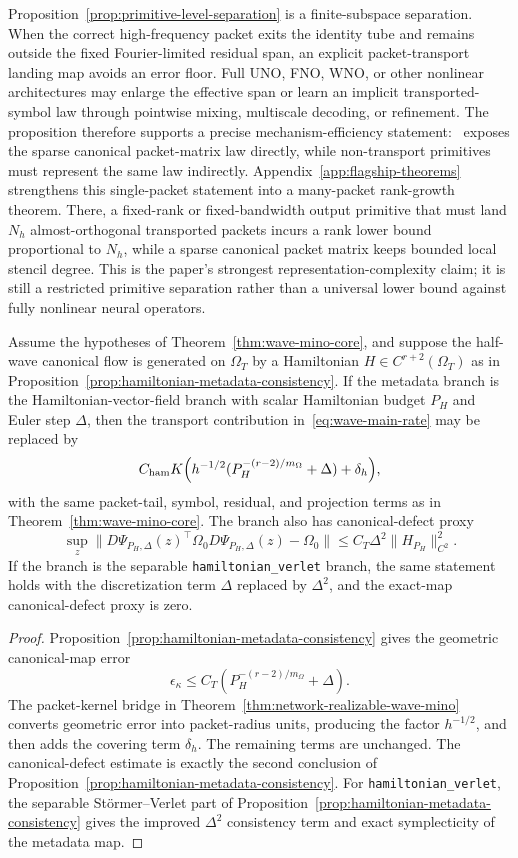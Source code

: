 Proposition~\ref{prop:primitive-level-separation} is a finite-subspace separation.  When the correct high-frequency packet exits the identity tube and remains outside the fixed Fourier-limited residual span, an explicit packet-transport landing map avoids an error floor.  Full UNO, FNO, WNO, or other nonlinear architectures may enlarge the effective span or learn an implicit transported-symbol law through pointwise mixing, multiscale decoding, or refinement.  The proposition therefore supports a precise mechanism-efficiency statement: \MiNO\ exposes the sparse canonical packet-matrix law directly, while non-transport primitives must represent the same law indirectly.
Appendix~\ref{app:flagship-theorems} strengthens this single-packet statement into a many-packet rank-growth theorem.  There, a fixed-rank or fixed-bandwidth output primitive that must land $N_h$ almost-orthogonal transported packets incurs a rank lower bound proportional to $N_h$, while a sparse canonical packet matrix keeps bounded local stencil degree.  This is the paper's strongest representation-complexity claim; it is still a restricted primitive separation rather than a universal lower bound against fully nonlinear neural operators.

\begin{corollary}
\label{cor:hamiltonian-branch-rate}
Assume the hypotheses of Theorem~\ref{thm:wave-mino-core}, and suppose the half-wave canonical flow is generated on $\Omega_T$ by a Hamiltonian $H\in C^{r+2}(\Omega_T)$ as in Proposition~\ref{prop:hamiltonian-metadata-consistency}.  If the metadata branch is the Hamiltonian-vector-field branch with scalar Hamiltonian budget $P_H$ and Euler step $\Delta$, then the transport contribution in~\eqref{eq:wave-main-rate} may be replaced by
\[
C_{\mathrm{ham}}K
\Bigl(h^{-1/2}(P_H^{-(r-2)/m_\Omega}+\Delta)+\delta_h\Bigr),
\]
with the same packet-tail, symbol, residual, and projection terms as in Theorem~\ref{thm:wave-mino-core}.  The branch also has canonical-defect proxy
\[
\sup_z
\bigl\|D\Psi_{P_H,\Delta}(z)^\top\Omega_0D\Psi_{P_H,\Delta}(z)-\Omega_0\bigr\|
\le
C_T\Delta^2\|H_{P_H}\|_{C^2}^2 .
\]
If the branch is the separable \texttt{hamiltonian\_verlet} branch, the same statement holds with the discretization term $\Delta$ replaced by $\Delta^2$, and the exact-map canonical-defect proxy is zero.
\end{corollary}

\begin{proof}
Proposition~\ref{prop:hamiltonian-metadata-consistency} gives the geometric canonical-map error
\[
\epsilon_\kappa
\le
C_T(P_H^{-(r-2)/m_\Omega}+\Delta).
\]
The packet-kernel bridge in Theorem~\ref{thm:network-realizable-wave-mino} converts geometric error into packet-radius units, producing the factor $h^{-1/2}$, and then adds the covering term $\delta_h$.  The remaining terms are unchanged.  The canonical-defect estimate is exactly the second conclusion of Proposition~\ref{prop:hamiltonian-metadata-consistency}. For \texttt{hamiltonian\_verlet}, the separable St\"ormer--Verlet part of Proposition~\ref{prop:hamiltonian-metadata-consistency} gives the improved $\Delta^2$ consistency term and exact symplecticity of the metadata map.
\end{proof}

